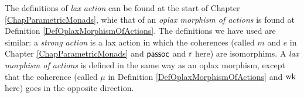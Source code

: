 \documentclass[11pt]{report}
\begin{document}
\begin{definition}
\begin{itemize}
  \end{itemize}
  \label{DefSequoidalCategory}
\end{definition}
\begin{remark}
  The definitions of \emph{lax action} can be found at the start of Chapter \ref{ChapParametricMonads}, whie that of an \emph{oplax morphism of actions} is found at Definition \ref{DefOplaxMorphismOfActions}.  
  The definitions we have used are similar: a \emph{strong action} is a lax action in which the coherences (called $m$ and $e$ in Chapter \ref{ChapParametricMonads} and $\operatorname{{\mathsf{passoc}}}$ and $\operatorname{{\mathsf{r}}}$ here) are isomorphims.  
  A \emph{lax morphism of actions} is defined in the same way as an oplax morphism, except that the coherence (called $\mu$ in Definition \ref{DefOplaxMorphismOfActions} and $\operatorname{wk}$ here) goes in the opposite direction.
\end{remark}
\end{document}
